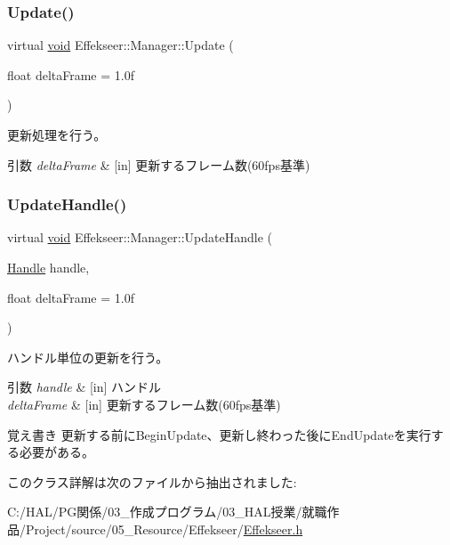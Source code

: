 \subsubsection{\texorpdfstring{Update()}{Update()}}
{\footnotesize\ttfamily virtual \mbox{\hyperlink{namespace_effekseer_ab34c4088e512200cf4c2716f168deb56}{void}} Effekseer\+::\+Manager\+::\+Update (\begin{DoxyParamCaption}\item[{float}]{delta\+Frame = {\ttfamily 1.0f} }\end{DoxyParamCaption})\hspace{0.3cm}{\ttfamily [pure virtual]}}



更新処理を行う。 


\begin{DoxyParams}{引数}
{\em delta\+Frame} & \mbox{[}in\mbox{]} 更新するフレーム数(60fps基準) \\
\hline
\end{DoxyParams}
\mbox{\label{class_effekseer_1_1_manager_afe8a0df796e161f68a511540c76df839}} 
\subsubsection{\texorpdfstring{Update\+Handle()}{UpdateHandle()}}
{\footnotesize\ttfamily virtual \mbox{\hyperlink{namespace_effekseer_ab34c4088e512200cf4c2716f168deb56}{void}} Effekseer\+::\+Manager\+::\+Update\+Handle (\begin{DoxyParamCaption}\item[{\mbox{\hyperlink{namespace_effekseer_afba58b8d812da862190e9bbfc040824a}{Handle}}}]{handle,  }\item[{float}]{delta\+Frame = {\ttfamily 1.0f} }\end{DoxyParamCaption})\hspace{0.3cm}{\ttfamily [pure virtual]}}



ハンドル単位の更新を行う。 


\begin{DoxyParams}{引数}
{\em handle} & \mbox{[}in\mbox{]} ハンドル \\
\hline
{\em delta\+Frame} & \mbox{[}in\mbox{]} 更新するフレーム数(60fps基準) \\
\hline
\end{DoxyParams}
\begin{DoxyNote}{覚え書き}
更新する前に\+Begin\+Update、更新し終わった後に\+End\+Updateを実行する必要がある。 
\end{DoxyNote}


このクラス詳解は次のファイルから抽出されました\+:\begin{DoxyCompactItemize}
\item 
C\+:/\+H\+A\+L/\+P\+G関係/03\+\_\+作成プログラム/03\+\_\+\+H\+A\+L授業/就職作品/\+Project/source/05\+\_\+\+Resource/\+Effekseer/\mbox{\hyperlink{_effekseer_8h}{Effekseer.\+h}}\end{DoxyCompactItemize}
